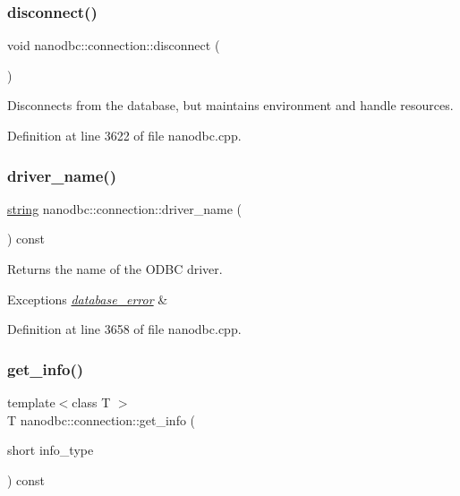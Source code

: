 \subsubsection{\texorpdfstring{disconnect()}{disconnect()}}
{\footnotesize\ttfamily void nanodbc\+::connection\+::disconnect (\begin{DoxyParamCaption}{ }\end{DoxyParamCaption})}



Disconnects from the database, but maintains environment and handle resources. 



Definition at line 3622 of file nanodbc.\+cpp.

\mbox{\label{classnanodbc_1_1connection_a9a93b35bd875edefa81c39c14ecc282f}} 
\subsubsection{\texorpdfstring{driver\_name()}{driver\_name()}}
{\footnotesize\ttfamily \mbox{\hyperlink{namespacenanodbc_abfc0ece56278e590911ec8352774c212}{string}} nanodbc\+::connection\+::driver\+\_\+name (\begin{DoxyParamCaption}{ }\end{DoxyParamCaption}) const}



Returns the name of the O\+D\+BC driver. 


\begin{DoxyExceptions}{Exceptions}
{\em \mbox{\hyperlink{classnanodbc_1_1database__error}{database\+\_\+error}}} & \\
\hline
\end{DoxyExceptions}


Definition at line 3658 of file nanodbc.\+cpp.

\mbox{\label{classnanodbc_1_1connection_aaa9d4619442694c11b26e3a044a8e839}} 
\subsubsection{\texorpdfstring{get\_info()}{get\_info()}}
{\footnotesize\ttfamily template$<$class T $>$ \\
T nanodbc\+::connection\+::get\+\_\+info (\begin{DoxyParamCaption}\item[{short}]{info\+\_\+type }\end{DoxyParamCaption}) const}



